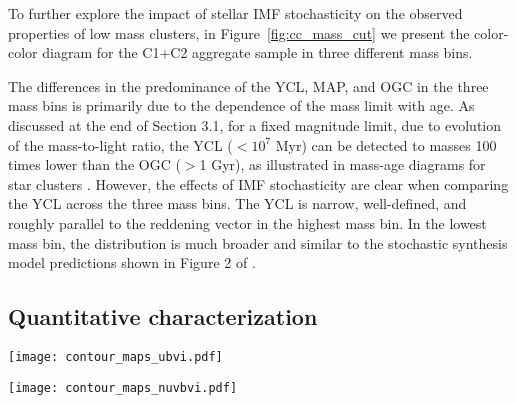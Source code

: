 \documentclass[linenumbers]{aastex63}
\begin{document}
To further explore the impact of stellar IMF stochasticity on the observed properties of low mass clusters, in Figure~\ref{fig:cc_mass_cut} we present the color-color diagram for the C1+C2 aggregate sample in three different mass bins.

The differences in the predominance of the YCL, MAP, and OGC in the three mass bins is primarily due to the dependence of the mass limit with age. As discussed at the end of Section 3.1, for a fixed magnitude limit, due to evolution of the mass-to-light ratio, the YCL ($<10^7$ Myr) can be detected to masses 100 times lower than the OGC ($>$1 Gyr), as illustrated in mass-age diagrams for star clusters \citep[e.g.,][]{cook_star_2019}.
However, the effects of IMF stochasticity are clear when comparing the YCL across the three mass bins.  The YCL is narrow, well-defined, and roughly parallel to the reddening vector in the highest mass bin.  In the lowest mass bin, the distribution is much broader and similar to the stochastic synthesis model predictions shown in Figure 2 of \citet{fouesneau_analyzing_2012}.




\subsection{Quantitative characterization}\label{ssect:cc_regions}
\begin{figure*} 
\texttt{[image: contour\_maps\_ubvi.pdf]}
 \caption{Characteristic regions in U-B vs V-I color-color diagrams of C1 and C2 clusters and C3 compact associations.
 We show human and ML classified samples in the top and bottom row, respectively.
 We compute the color-color maps by stacking each cluster as a normalized Gaussian function on a grid using the color uncertainties as standard deviations. 
 We then identify the YCL (blue) and the MAP (green) as the contour lines encircling 50\,\% of the highest point for C1 clusters and C3 compact associations, respectively. We then find the largest contour line which only encircles the OGC (red), separating this region from the MAP. We show the hulls of all three regions for C2 clusters.
 In order to compare the slope of the reddening vector and the sequence of dust-reddened objects in the YCL, we fit a linear function to all C3 compact association which are inside the blue segmented area.
 }
 \label{fig:color_color_regions}
\end{figure*}
\begin{figure*} 
\texttt{[image: contour\_maps\_nuvbvi.pdf]}
 \caption{Same as Figure\,\ref{fig:color_color_regions} but with NUV-B colors on the \textit{y}-axis.}
 \label{fig:color_color_regions_nuvb}
\end{figure*}
\end{document}
